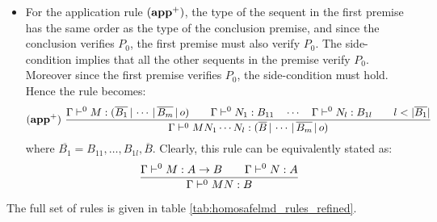 \begin{itemize}
\item For the application rule $\mathbf{(app^+)}$, the type of the sequent in the first premise has the same order
as the type of the conclusion premise, and since the conclusion
verifies $P_0$, the first premise must also verify $P_0$. The
side-condition implies that all the other sequents in the premise
verify $P_0$. Moreover since the first premise verifies $P_0$, the
side-condition must hold. Hence the rule becomes:
$$ \mathbf{(app^+)} \
    \frac{\displaystyle 
        \Gamma \vdash^0 M : (\overline{B_1} \, | \, \cdots \, | \, \overline{B_m} \, | \, o) \qquad
        \Gamma \vdash^0 N_1 : B_{11} \quad \cdots \quad \Gamma \vdash^0 N_{l} : B_{1l} \qquad l < |\overline{B_1}|
    }{
        \Gamma \vdash^0 M N_1 \cdots N_{l} : (\overline{B} \, | \, \cdots \, | \, \overline{B_m} \, | \, o)
    }
$$
where $\overline{B_1} = B_{11}, \ldots, B_{1l},\overline{B}$.
Clearly, this rule can be equivalently stated as:
$$ \frac{\displaystyle \Gamma \vdash^0 M : A\rightarrow B
                                        \qquad \Gamma \vdash^{0} N : A
                                   }{\Gamma  \vdash^{0} M N : B}$$
\end{itemize}

The full set of rules is given in table \ref{tab:homosafelmd_rules_refined}.

